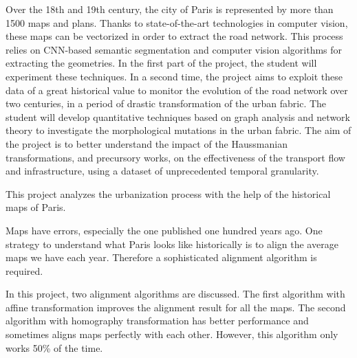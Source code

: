 \begin{fquote}Over the 18th and 19th century, the city of Paris is represented by more than 1500 maps and plans. Thanks to state-of-the-art technologies in computer vision, these maps can be vectorized in order to extract the road network. This process relies on CNN-based semantic segmentation and computer vision algorithms for extracting the geometries. In the first part of the project, the student will experiment these techniques. In a second time, the project aims to exploit these data of a great historical value to monitor the evolution of the road network over two centuries, in a period of drastic transformation of the urban fabric. The student will develop quantitative techniques based on graph analysis and network theory to investigate the morphological mutations in the urban fabric. The aim of the project is to better understand the impact of the Haussmanian transformations, and precursory works, on the effectiveness of the transport flow and infrastructure, using a dataset of unprecedented temporal granularity.
\end{fquote}

This project analyzes the urbanization process with the help of the historical maps of Paris.

Maps have errors, especially the one published one hundred years ago. One strategy to understand what Paris looks like historically is to align the average maps we have each year. Therefore a sophisticated alignment algorithm is required.

In this project, two alignment algorithms are discussed. The first algorithm with affine transformation improves the alignment result for all the maps. The second algorithm with homography transformation has better performance and sometimes aligns maps perfectly with each other. However, this algorithm only works 50\% of the time.

